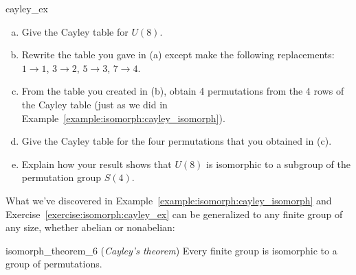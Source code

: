 \begin{exercise}{cayley_ex}
\begin{enumerate}[(a)]
\item
Give the Cayley table for $U(8)$.
\item
Rewrite the table you gave in (a) except make the following replacements:  $1 \rightarrow 1$, $3 \rightarrow 2$, $5 \rightarrow 3$, $7 \rightarrow 4$. 
\item
From the table you created in (b), obtain 4 permutations from the 4 rows of the Cayley table (just as we did in  Example~\ref{example:isomorph:cayley_isomorph}). 
\item
Give the Cayley table for the four permutations that you obtained in (c).
\item
Explain how your result shows that $U(8)$ is isomorphic to a subgroup of the permutation group $S(4)$.
\end{enumerate}
\end{exercise}

What we've discovered in Example~\ref{example:isomorph:cayley_isomorph} and Exercise~\ref{exercise:isomorph:cayley_ex}
can be generalized to any finite group of any size, whether abelian or nonabelian:

\begin{prop}{isomorph_theorem_6} (\emph{Cayley's theorem}) 
Every finite group is isomorphic to a group of permutations.
\end{prop}

